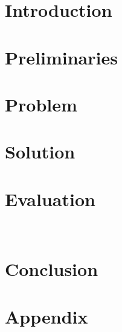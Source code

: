 \section{Introduction}

%
\section{Preliminaries}

%
\section{Problem}

%
\section{Solution}

%
\section{Evaluation}~\label{sec:eval}

%
\section{Conclusion}










\newpage
\section{Appendix}




